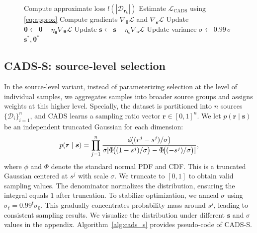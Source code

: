 \begin{figure}[t]
\begin{minipage}{0.5\textwidth}
\begin{algorithm}[H]
\begin{algorithmic}[1]
                        \STATE Compute approximate loss $l(|\mathcal{D}_{\bm{r}_k}|)$  
                    \ENDFOR  
                    \STATE Estimate $\mathcal{L}_{\text{CADS}}$ using \eqref{eq:approx}  
                    \STATE Compute gradients $\nabla_{\bm{\theta}}\mathcal{L}$ and $\nabla_{\bm{s}}\mathcal{L}$  
                    \STATE Update $\bm{\theta}\leftarrow\bm{\theta}-\eta_{\bm{\theta}}\nabla_{\bm{\theta}}\mathcal{L}$  
                    \STATE Update $\bm{s}\leftarrow \bm{s}-\eta_{\bm{s}}\nabla_{\bm{s}}\mathcal{L}$  
                    \STATE Update variance $\sigma\leftarrow0.99\,\sigma$  
                \ENDWHILE  
                \RETURN $\bm{s}^*, \bm{\theta}^*$  
            \end{algorithmic}  
        \end{algorithm}  
    \end{minipage}  
\end{figure}  

\subsection{CADS‑S: source‑level selection}  
In the source-level variant, instead of parameterizing selection at the level of individual samples, we aggregates samples into broader source groups and assigns weights at this higher level. Specially, the dataset is partitioned into $n$ sources $\{\mathcal{D}_{i}\}_{i=1}^{n}$, and CADS learns a sampling ratio vector $\bm{r}\in[0,1]^{n}$.  
We let $p(\bm{r}\mid \bm{s})$ be an independent truncated Gaussian for each dimension:  
\begin{equation}
\small
p(\bm{r}\mid \bm{s})=\prod_{j=1}^{n}
\frac{\phi\!\bigl((r^{j}-s^{j})/\sigma\bigr)}
{\sigma[\Phi\!\bigl((1-s^{j})/\sigma\bigr)-\Phi\!\bigl((-s^{j})/\sigma\bigr)]},
\end{equation}
where $\phi$ and $\Phi$ denote the standard normal PDF and CDF.  
This is a truncated Gaussian centered at $s^j$ with scale $\sigma$. We truncate to \([0,1]\) to obtain valid sampling values. The denominator normalizes the distribution, ensuring the integral equals \(1\) after truncation. 
To stabilize optimization, we anneal $\sigma$ using $\sigma_{t}=0.99^{t}\sigma_{0}$. This gradually concentrates probability mass around $s^j$, leading to consistent sampling results. We visualize the distribution under different $\bm{s}$ and $\sigma$ values in the appendix.
Algorithm~\ref{alg:cads_s} provides pseudo‑code of CADS-S.
